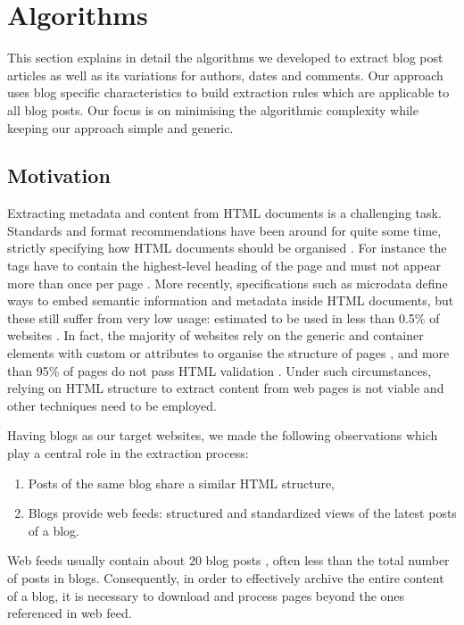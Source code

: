 \section{Algorithms}
\label{algorithms}

This section explains in detail the algorithms we developed to extract blog post articles as well as its variations for authors, dates and comments. Our approach uses blog specific characteristics to build extraction rules which are applicable to all blog posts. Our focus is on minimising the algorithmic complexity while keeping our approach simple and generic.


\subsection{Motivation}
\label{motivation}

Extracting metadata and content from HTML documents is a challenging task. Standards and format recommendations have been around for quite some time, strictly specifying how HTML documents should be organised \cite{w3c2014}. For instance the  tags have to contain the highest-level heading of the page and must not appear more than once per page \cite{w3c2002}. More recently, specifications such as microdata \cite{whatwg2014} define ways to embed semantic information and metadata inside HTML documents, but these still suffer from very low usage: estimated to be used in less than 0.5\% of websites \cite{andrewrogers2014}. In fact, the majority of websites rely on the generic  and  container elements with custom  or  attributes to organise the structure of pages \cite{brianwilson2008}, and more than 95\% of pages do not pass HTML validation \cite{brianwilson2008-a}. Under such circumstances, relying on HTML structure to extract content from web pages is not viable and other techniques need to be employed.


Having blogs as our target websites, we made the following observations which play a central role in the extraction process:
\begin{enumerate}[label={(\arabic*)}]
  \item\label{similarhtmlAssum} Posts of the same blog share a similar HTML structure,
  \item\label{havefeedAssum} Blogs provide web feeds: structured and standardized views of the latest posts of a blog.
\end{enumerate}
Web feeds usually contain about 20 blog posts \cite{oita2010}, often less than the total number of posts in blogs. Consequently, in order to effectively archive the entire content of a blog, it is necessary to download and process pages beyond the ones referenced in web feed.


